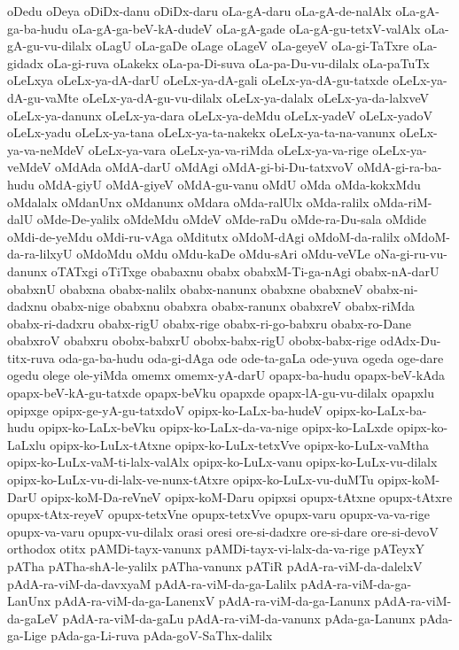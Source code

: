 {oDedu
oDeya
oDiDx-danu
oDiDx-daru
oLa-gA-daru
oLa-gA-de-nalAlx
oLa-gA-ga-ba-hudu
oLa-gA-ga-beV-kA-dudeV
oLa-gA-gade
oLa-gA-gu-tetxV-valAlx
oLa-gA-gu-vu-dilalx
oLagU
oLa-gaDe
oLage
oLageV
oLa-geyeV
oLa-gi-TaTxre
oLa-gidadx
oLa-gi-ruva
oLakekx
oLa-pa-Di-suva
oLa-pa-Du-vu-dilalx
oLa-paTuTx
oLeLxya
oLeLx-ya-dA-darU
oLeLx-ya-dA-gali
oLeLx-ya-dA-gu-tatxde
oLeLx-ya-dA-gu-vaMte
oLeLx-ya-dA-gu-vu-dilalx
oLeLx-ya-dalalx
oLeLx-ya-da-lalxveV
oLeLx-ya-danunx
oLeLx-ya-dara
oLeLx-ya-deMdu
oLeLx-yadeV
oLeLx-yadoV
oLeLx-yadu
oLeLx-ya-tana
oLeLx-ya-ta-nakekx
oLeLx-ya-ta-na-vanunx
oLeLx-ya-va-neMdeV
oLeLx-ya-vara
oLeLx-ya-va-riMda
oLeLx-ya-va-rige
oLeLx-ya-veMdeV
oMdAda
oMdA-darU
oMdAgi
oMdA-gi-bi-Du-tatxvoV
oMdA-gi-ra-ba-hudu
oMdA-giyU
oMdA-giyeV
oMdA-gu-vanu
oMdU
oMda
oMda-kokxMdu
oMdalalx
oMdanUnx
oMdanunx
oMdara
oMda-ralUlx
oMda-ralilx
oMda-riM-dalU
oMde-De-yalilx
oMdeMdu
oMdeV
oMde-raDu
oMde-ra-Du-sala
oMdide
oMdi-de-yeMdu
oMdi-ru-vAga
oMditutx
oMdoM-dAgi
oMdoM-da-ralilx
oMdoM-da-ra-lilxyU
oMdoMdu
oMdu
oMdu-kaDe
oMdu-sAri
oMdu-veVLe
oNa-gi-ru-vu-danunx
oTATxgi
oTiTxge
obabaxnu
obabx
obabxM-Ti-ga-nAgi
obabx-nA-darU
obabxnU
obabxna
obabx-nalilx
obabx-nanunx
obabxne
obabxneV
obabx-ni-dadxnu
obabx-nige
obabxnu
obabxra
obabx-ranunx
obabxreV
obabx-riMda
obabx-ri-dadxru
obabx-rigU
obabx-rige
obabx-ri-go-babxru
obabx-ro-Dane
obabxroV
obabxru
obobx-babxrU
obobx-babx-rigU
obobx-babx-rige
odAdx-Du-titx-ruva
oda-ga-ba-hudu
oda-gi-dAga
ode
ode-ta-gaLa
ode-yuva
ogeda
oge-dare
ogedu
olege
ole-yiMda
omemx
omemx-yA-darU
opapx-ba-hudu
opapx-beV-kAda
opapx-beV-kA-gu-tatxde
opapx-beVku
opapxde
opapx-lA-gu-vu-dilalx
opapxlu
opipxge
opipx-ge-yA-gu-tatxdoV
opipx-ko-LaLx-ba-hudeV
opipx-ko-LaLx-ba-hudu
opipx-ko-LaLx-beVku
opipx-ko-LaLx-da-va-nige
opipx-ko-LaLxde
opipx-ko-LaLxlu
opipx-ko-LuLx-tAtxne
opipx-ko-LuLx-tetxVve
opipx-ko-LuLx-vaMtha
opipx-ko-LuLx-vaM-ti-lalx-valAlx
opipx-ko-LuLx-vanu
opipx-ko-LuLx-vu-dilalx
opipx-ko-LuLx-vu-di-lalx-ve-nunx-tAtxre
opipx-ko-LuLx-vu-duMTu
opipx-koM-DarU
opipx-koM-Da-reVneV
opipx-koM-Daru
opipxsi
opupx-tAtxne
opupx-tAtxre
opupx-tAtx-reyeV
opupx-tetxVne
opupx-tetxVve
opupx-varu
opupx-va-va-rige
opupx-va-varu
opupx-vu-dilalx
orasi
oresi
ore-si-dadxre
ore-si-dare
ore-si-devoV
orthodox
otitx
pAMDi-tayx-vanunx
pAMDi-tayx-vi-lalx-da-va-rige
pATeyxY
pATha
pATha-shA-le-yalilx
pATha-vanunx
pATiR
pAdA-ra-viM-da-dalelxV
pAdA-ra-viM-da-davxyaM
pAdA-ra-viM-da-ga-Lalilx
pAdA-ra-viM-da-ga-LanUnx
pAdA-ra-viM-da-ga-LanenxV
pAdA-ra-viM-da-ga-Lanunx
pAdA-ra-viM-da-gaLeV
pAdA-ra-viM-da-gaLu
pAdA-ra-viM-da-vanunx
pAda-ga-Lanunx
pAda-ga-Lige
pAda-ga-Li-ruva
pAda-goV-SaThx-dalilx
}
